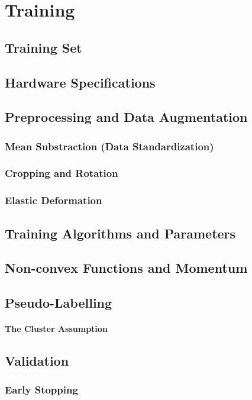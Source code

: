 \chapter{Training}

	\section{Training Set}

	\section{Hardware Specifications}

	\section {Preprocessing and Data Augmentation}


		\subsection{Mean Substraction (Data Standardization)}

		\subsection{Cropping and Rotation}

		\subsection{Elastic Deformation}

	\section {Training Algorithms and Parameters}
	
	\section{Non-convex Functions and Momentum}

	\section {Pseudo-Labelling}

		\subsubsection {The Cluster Assumption}

	\section {Validation}
		
		\subsection{Early Stopping}